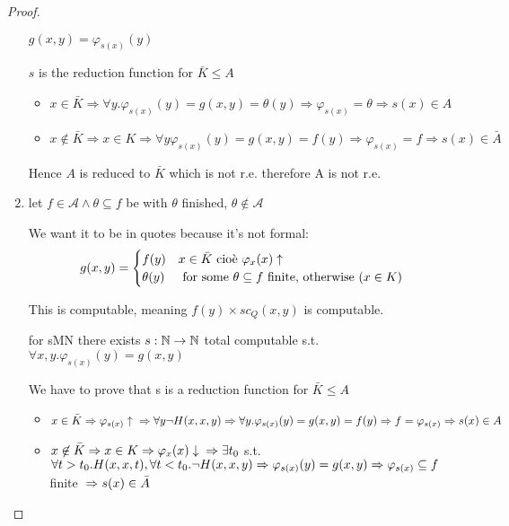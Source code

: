 \begin{theorem}
\begin{proof}
\begin{enumerate}
    $ g(x,y) = \varphi_{s(x)}(y)$

    $s$ is the reduction function for $ \bar{K}\leq A $

    \begin{itemize}
    \item $ x\in\bar{K} \Rightarrow \forall y. \varphi_{s(x)}(y) = g(x,y) =
      \theta(y) \Rightarrow \varphi_{s(x)} = \theta \Rightarrow s(x) \in A $
    \item $ x\not\in\bar{K}\Rightarrow x\in K\Rightarrow\forall
      y\varphi_{s(x)}(y) = g(x,y)=f(y)\Rightarrow\varphi_{s(x)}=f\Rightarrow
      s(x)\in\bar{A}$
    \end{itemize}

    Hence $A$ is reduced to $ \bar{K} $ which is not r.e. therefore A is
    not r.e.

    \item
    let $ f\in\mathcal{A}\land\theta\subseteq f $ be with $ \theta $
    finished, $ \theta\not\in\mathcal{A} $

    We want it to be in quotes because it's not formal: \begin{equation*}
      g(x,y) = \begin{cases}
        f(y) & x \in\bar{K} $ cioè $ \varphi_x(x)\uparrow \\
        \theta(y) & $ for some $ \theta\subseteq f $ finite, otherwise ($ x\in K $) $
      \end{cases}
    \end{equation*}

    This is computable, meaning $f(y) \times sc_Q(x,y) $ is
    computable.

    for sMN there exists $ s:\mathbb{N}\rightarrow\mathbb{N} $ total computable s.t. $
    \forall x,y. \varphi_{s(x)}(y) = g(x,y) $

    We have to prove that s is a reduction function for $ \bar{K}\leq A $

    \begin{itemize}
    \item $ x\in\bar{K}\\ \Rightarrow\varphi_{s(x)}\uparrow \\
      \Rightarrow\forall y\lnot H(x,x,y)\\ \Rightarrow \forall
      y.\varphi_{s(x)}(y) = g(x,y) = f(y)\\ \Rightarrow f = \varphi_{s(x)}\\
      \Rightarrow s(x)\in A$
    \item
      $ x\not\in\bar{K}\\ \Rightarrow x\in K\\ \Rightarrow
      \varphi_x(x)\downarrow\\ \Rightarrow \exists t_0 $ s.t.
      $ \forall
      t>t_0. H(x,x,t), \forall t<t_0. \lnot H(x,x,y)\\
      \Rightarrow\varphi_{s(x)}(y) = g(x,y)\\ \Rightarrow
      \varphi_{s(x)}\subseteq f$ finite
      $\\ \Rightarrow s(x) \in \bar{A} $
    \end{itemize}
  \end{enumerate}


\end{proof}
\end{theorem}
